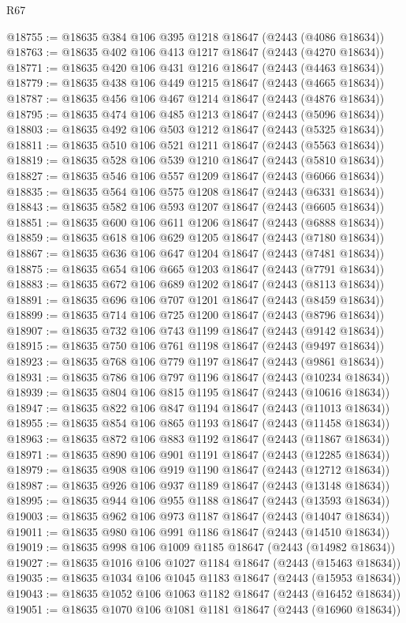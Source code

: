 \begin{lexlean}{R67}
\begin{coremodule}
@18755 := @18635 @384 @106 @395 @1218 @18647 (@2443 (@4086 @18634))
@18763 := @18635 @402 @106 @413 @1217 @18647 (@2443 (@4270 @18634))
@18771 := @18635 @420 @106 @431 @1216 @18647 (@2443 (@4463 @18634))
@18779 := @18635 @438 @106 @449 @1215 @18647 (@2443 (@4665 @18634))
@18787 := @18635 @456 @106 @467 @1214 @18647 (@2443 (@4876 @18634))
@18795 := @18635 @474 @106 @485 @1213 @18647 (@2443 (@5096 @18634))
@18803 := @18635 @492 @106 @503 @1212 @18647 (@2443 (@5325 @18634))
@18811 := @18635 @510 @106 @521 @1211 @18647 (@2443 (@5563 @18634))
@18819 := @18635 @528 @106 @539 @1210 @18647 (@2443 (@5810 @18634))
@18827 := @18635 @546 @106 @557 @1209 @18647 (@2443 (@6066 @18634))
@18835 := @18635 @564 @106 @575 @1208 @18647 (@2443 (@6331 @18634))
@18843 := @18635 @582 @106 @593 @1207 @18647 (@2443 (@6605 @18634))
@18851 := @18635 @600 @106 @611 @1206 @18647 (@2443 (@6888 @18634))
@18859 := @18635 @618 @106 @629 @1205 @18647 (@2443 (@7180 @18634))
@18867 := @18635 @636 @106 @647 @1204 @18647 (@2443 (@7481 @18634))
@18875 := @18635 @654 @106 @665 @1203 @18647 (@2443 (@7791 @18634))
@18883 := @18635 @672 @106 @689 @1202 @18647 (@2443 (@8113 @18634))
@18891 := @18635 @696 @106 @707 @1201 @18647 (@2443 (@8459 @18634))
@18899 := @18635 @714 @106 @725 @1200 @18647 (@2443 (@8796 @18634))
@18907 := @18635 @732 @106 @743 @1199 @18647 (@2443 (@9142 @18634))
@18915 := @18635 @750 @106 @761 @1198 @18647 (@2443 (@9497 @18634))
@18923 := @18635 @768 @106 @779 @1197 @18647 (@2443 (@9861 @18634))
@18931 := @18635 @786 @106 @797 @1196 @18647 (@2443 (@10234 @18634))
@18939 := @18635 @804 @106 @815 @1195 @18647 (@2443 (@10616 @18634))
@18947 := @18635 @822 @106 @847 @1194 @18647 (@2443 (@11013 @18634))
@18955 := @18635 @854 @106 @865 @1193 @18647 (@2443 (@11458 @18634))
@18963 := @18635 @872 @106 @883 @1192 @18647 (@2443 (@11867 @18634))
@18971 := @18635 @890 @106 @901 @1191 @18647 (@2443 (@12285 @18634))
@18979 := @18635 @908 @106 @919 @1190 @18647 (@2443 (@12712 @18634))
@18987 := @18635 @926 @106 @937 @1189 @18647 (@2443 (@13148 @18634))
@18995 := @18635 @944 @106 @955 @1188 @18647 (@2443 (@13593 @18634))
@19003 := @18635 @962 @106 @973 @1187 @18647 (@2443 (@14047 @18634))
@19011 := @18635 @980 @106 @991 @1186 @18647 (@2443 (@14510 @18634))
@19019 := @18635 @998 @106 @1009 @1185 @18647 (@2443 (@14982 @18634))
@19027 := @18635 @1016 @106 @1027 @1184 @18647 (@2443 (@15463 @18634))
@19035 := @18635 @1034 @106 @1045 @1183 @18647 (@2443 (@15953 @18634))
@19043 := @18635 @1052 @106 @1063 @1182 @18647 (@2443 (@16452 @18634))
@19051 := @18635 @1070 @106 @1081 @1181 @18647 (@2443 (@16960 @18634))

\end{coremodule}
\end{lexlean}
